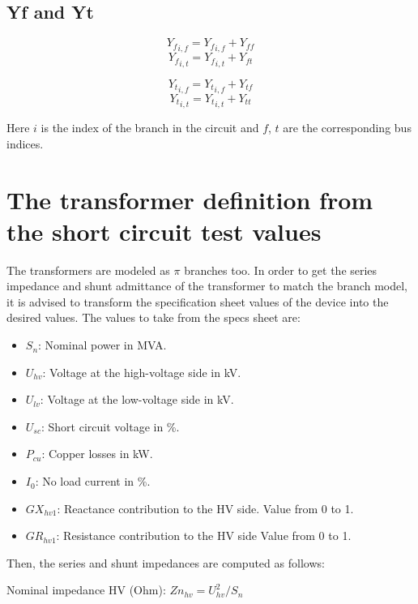 \documentclass[11pt,fleqn]{book} %
\begin{document}
\subsection{Yf and Yt}

$${Y_f}_{i, f} = {Y_f}_{i, f} + Y_{ff}$$
$${Y_f}_{i, t} = {Y_f}_{i, t} + Y_{ft}$$

$${Y_t}_{i, f} = {Y_t}_{i, f} + Y_{tf}$$
$${Y_t}_{i, t} = {Y_t}_{i, t} + Y_{tt}$$

Here $i$ is the index of the branch in the circuit and $f$, $t$ are the corresponding bus indices.


\section{The transformer definition from the short circuit test values}
\label{Transformer_definition}

The transformers are modeled as $\pi$ branches too. In order to get the series impedance and shunt admittance of the transformer to match the branch model, it is advised to transform the specification sheet values of the device into the desired values. The values to take from the specs sheet are: \newline
\begin{itemize}
	\item $S_n$: Nominal power in MVA.
	\item $U_{hv}$: Voltage at the high-voltage side in kV.
	\item $U_{lv}$: Voltage at the low-voltage side in kV.
	\item $U_{sc}$: Short circuit voltage in \%.
	\item $P_{cu}$: Copper losses in kW.
	\item $I_0$: No load current in \%.
	\item $GX_{hv1}$: Reactance contribution to the HV side. Value from 0 to 1.
	\item $GR_{hv1}$: Resistance contribution to the HV side Value from 0 to 1.\newline
\end{itemize}

Then, the series and shunt impedances are computed as follows:

Nominal impedance HV (Ohm): $Zn_{hv} = U_{hv}^2 / S_n$ \newline
\end{document}
